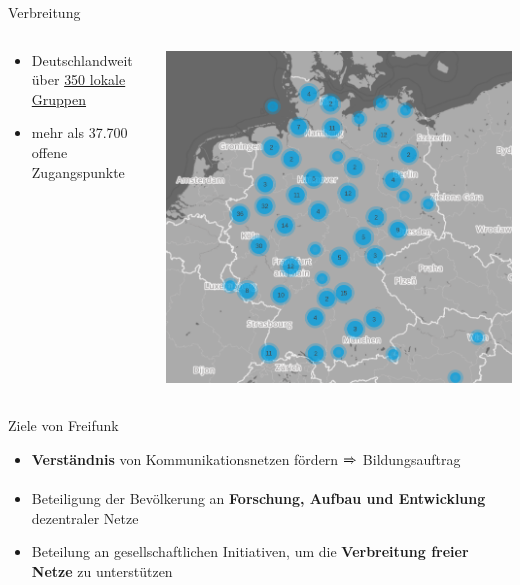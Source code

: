 \documentclass[t]{beamer}
\begin{document}
  \begin{frame}{Verbreitung}
    \begin{columns}
      \begin{column}{0.6\textwidth}
        \begin{itemize}
          \item Deutschlandweit über  \href{http://freifunk.net/wie-mache-ich-mit/community-finden/}{350 lokale Gruppen}
          \item mehr als 37.700 offene Zugangspunkte

        \end{itemize}
      \end{column}
      \begin{column}{0.4\textwidth}
        \begin{center}
          \includegraphics[width=\textwidth]{images/2016-06-01_map-de}
        \end{center}
      \end{column}
    \end{columns}
  \end{frame}

  \begin{frame}{Ziele von Freifunk}
    \begin{itemize}
      \item \textbf{Verständnis} von Kommunikationsnetzen fördern $\xRightarrow{}$ Bildungsauftrag
      \item Beteiligung der Bevölkerung an \textbf{Forschung, Aufbau und Entwicklung} dezentraler Netze
      \item Beteilung an gesellschaftlichen Initiativen, um die \textbf{Verbreitung freier Netze} zu unterstützen
    \end{itemize}
  \end{frame}
\end{document}
